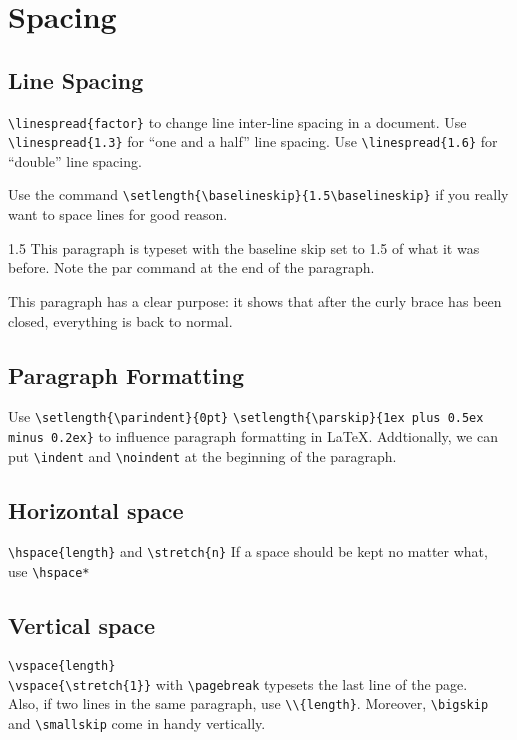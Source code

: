 \documentclass[a4paper,11pt]{article}
\begin{document}
\section{Spacing}
\subsection{Line Spacing}
\vskip 20pt
\verb+\linespread{factor}+
\vskip 20pt
\flushleft
to change line inter-line spacing in a document. Use
\verb+\linespread{1.3}+ for ``one and a half'' line spacing.
Use \verb+\linespread{1.6}+ for ``double'' line spacing.

Use the command
\vskip 20pt
\verb+\setlength{\baselineskip}{1.5\baselineskip}+
\vskip 20pt
\flushleft
if you really want to space lines for good reason.

{\setlength{\baselineskip}%
{1.5\baselineskip}
This paragraph is typeset with the baseline skip set to
1.5 of what it was before. Note the par command at the end
of the paragraph. \par}
This paragraph has a clear purpose: it shows that after
the curly brace has been closed, everything is back to
normal.

\subsection{Paragraph Formatting}
Use
\vskip 20pt
\verb+\setlength{\parindent}{0pt}+
\verb+\setlength{\parskip}{1ex plus 0.5ex minus 0.2ex}+
\vskip 20pt
\flushleft
to influence paragraph formatting in \LaTeX. Addtionally,
we can put
\vskip 20pt
\verb+\indent+ and \verb+\noindent+
\vskip 20pt
\flushleft
at the beginning of the paragraph.

\subsection{Horizontal space}
\verb+\hspace{length}+ and \verb+\stretch{n}+
If a space should be kept no matter what, use
\verb+\hspace*+
\subsection{Vertical space}
\verb+\vspace{length}+\\
\verb+\vspace{\stretch{1}}+ with \verb+\pagebreak+ typesets
the last line of the page.\\
Also, if two lines in the same paragraph, use
\verb+\\{length}+. Moreover, \verb+\bigskip+ and
\verb+\smallskip+ come in handy vertically.
\end{document}
